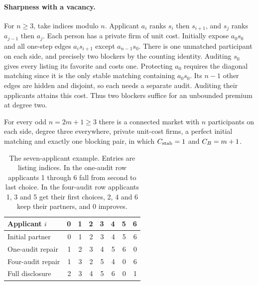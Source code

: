 \paragraph{Sharpness with a vacancy.}
For $n\geq3$, take indices modulo $n$. Applicant $a_i$ ranks $s_i$ then $s_{i+1}$, and $s_j$ ranks $a_{j-1}$ then $a_j$. Each person has a private firm of unit cost. Initially expose $a_0s_0$ and all one-step edges $a_i s_{i+1}$ except $a_{n-1}s_0$. There is one unmatched participant on each side, and precisely two blockers by the counting identity. Auditing $s_0$ gives every listing its favorite and costs one. Protecting $a_0$ requires the diagonal matching since it is the only stable matching containing $a_0s_0$. Its $n-1$ other edges are hidden and disjoint, so each needs a separate audit. Auditing their applicants attains this cost. Thus two blockers suffice for an unbounded premium at degree two.

\begin{theorem}\label{thm:three}
For every odd $n=2m+1\geq3$ there is a connected market with $n$ participants on each side, degree three everywhere, private unit-cost firms, a perfect initial matching and exactly one blocking pair, in which $C_{\mathrm{stab}}=1$ and $C_B=m+1$.
\end{theorem}

\begin{table}[t]
\centering
\begin{tabular}{@{}lrrrrrrr@{}}\toprule
Applicant $i$ & 0&1&2&3&4&5&6\\ \midrule
Initial partner        &0&1&2&3&4&5&6\\
One-audit repair       &1&2&3&4&5&6&0\\
Four-audit repair      &1&3&2&5&4&0&6\\
Full disclosure        &2&3&4&5&6&0&1\\ \bottomrule
\end{tabular}
\caption{The seven-applicant example. Entries are listing indices. In the one-audit row applicants 1 through 6 fall from second to last choice. In the four-audit row applicants 1, 3 and 5 get their first choices, 2, 4 and 6 keep their partners, and 0 improves.}
\label{tab:ring}
\end{table}

